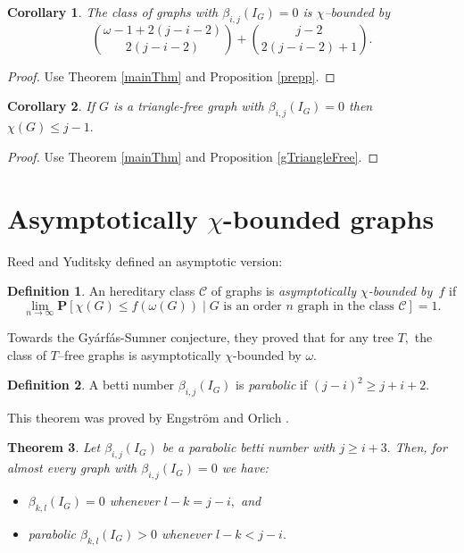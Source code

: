 \documentclass{article}
\theoremstyle{plain}
\newtheorem{thm}{Theorem}
\newtheorem{cor}[thm]{Corollary}
\theoremstyle{definition}
\newtheorem{defn}{Definition}
\begin{document}
\begin{cor} \label{mainCor1} The class of graphs with $ \beta_{i,j}(I_G) = 0$ is $\chi$--bounded by
\[ {\omega-1+2(j-i-2) \choose 2(j-i-2)} +  {j-2 \choose 2(j-i-2)+1}. \] 
\end{cor}
\begin{proof} Use Theorem \ref{mainThm} and  Proposition \ref{prepp}. 
\end{proof}

\begin{cor} \label{mainCor2} If $G$ is a triangle-free graph with $\beta_{i,j}(I_G) = 0$ then $\chi(G) \leq j-1.$
\end{cor}
\begin{proof} Use Theorem \ref{mainThm} and  Proposition \ref{gTriangleFree}. 
\end{proof}



\section{Asymptotically $\chi$-bounded graphs}

Reed and Yuditsky \cite{RY25} defined an asymptotic version:
\begin{defn}
An hereditary class $\mathcal{C}$ of graphs is \emph{asymptotically $\chi$-bounded by~$f$} if
\[
\lim_{n \rightarrow \infty} {\mathbf P}  [ \chi(G)\leq f(\omega(G))  \mid \textrm{$G$ is an order $n$ graph in the class $\mathcal{C}$}] = 1.
\]
\end{defn}
Towards the Gyárfás-Sumner conjecture, they proved that for any tree $T,$ the class of $T$--free graphs is asymptotically $\chi$-bounded by $\omega.$

\begin{defn}
A betti number $\beta_{i,j}(I_G)$ is \emph{parabolic} if $(j-i)^2 \geq j+i+2.$
\end{defn}

This  theorem was proved by Engström and Orlich \cite{EO23}.

\begin{thm}\label{eo} Let $\beta_{i,j}(I_G)$ be a parabolic betti number with $j\geq i+3.$ Then, for almost every graph with $ \beta_{i,j}(I_G) = 0$ we have:
\begin{itemize}
\item[1.] $\beta_{k,l}(I_G)=0$ whenever $l-k=j-i,$ and
\item[2.] parabolic $\beta_{k,l}(I_G)>0$ whenever  $l-k<j-i.$
\end{itemize}
\end{thm}
\end{document}
